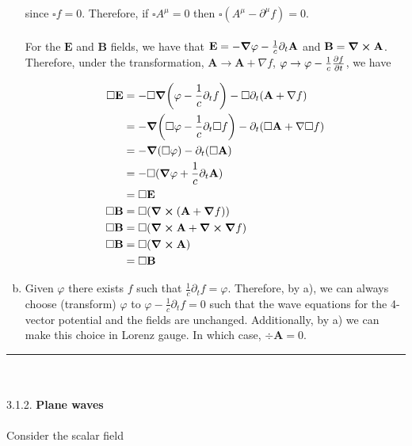 \documentclass[]{article}
\begin{document}
\begin{enumerate}[a)]
since $\square f = 0$. Therefore, if $\square A^\mu = 0$ then $\square (A^\mu - \partial^\mu f )= 0$. \\
\hfill \\
For the $\textbf{E}$ and $\textbf{B}$ fields, we have that $\textbf{E} = -\grad\varphi - \frac{1}{c}\partial_t \textbf{A}$ and $\textbf{B} = \curl \textbf{A}$. Therefore, under the transformation, $\textbf{A}\to \textbf{A} + \nabla f$, $\varphi\to \varphi - \frac{1}{c}\pdv{f}{t}$, we have

\begin{equation}
\begin{split}
\square \textbf{E} & =  - \square \grad( \varphi - \frac{1}{c}\partial_t f)  - \square\partial_t (\textbf{A} + \nabla f )\\
& = - \grad( \square \varphi - \frac{1}{c}\partial_t \square f)  -\partial_t (\square \textbf{A} + \nabla \square f )\\
& = - \grad( \square \varphi )  -\partial_t (\square \textbf{A} )\\
& = - \square (\grad\varphi +  \frac{1}{c}\partial_t \textbf{A} ) \\ 
& = \square \textbf{E} \\
\square \textbf{B} & =  \square (\curl ( \textbf{A} + \grad f))\\
\square \textbf{B} & = \square ( \curl\textbf{A} + \curl\grad f) \\
\square \textbf{B} & = \square ( \curl\textbf{A} )\\ 
& = \square \textbf{B} \\
\end{split}
\end{equation}

\item Given $\varphi$ there exists $f$ such that $\frac{1}{c}\partial_t f = \varphi$. Therefore, by a), we can always choose (transform) $\varphi$ to $\varphi - \frac{1}{c}\partial_t f = 0$ such that the wave equations for the 4-vector potential and the fields are unchanged. Additionally, by a) we can make this choice in Lorenz gauge. In which case, $\div\textbf{A} = 0 $.  

\end{enumerate}

\noindent\rule{15cm}{0.4pt} \\
\hfill \\
3.1.2. { \bf Plane waves} \\
\hfill \\
Consider the scalar field
\end{document}
